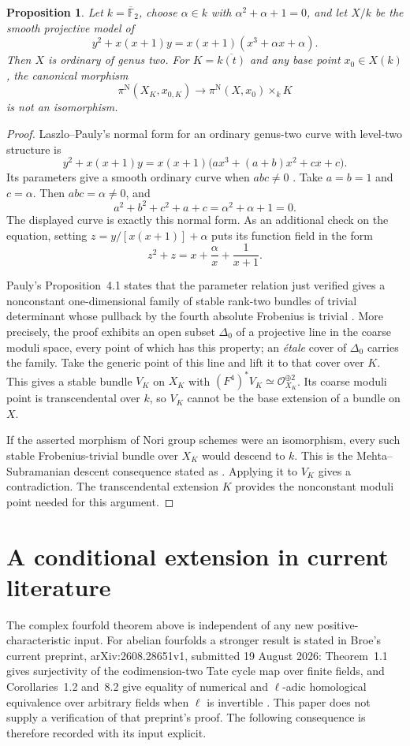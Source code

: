 \documentclass[11pt,a4paper]{article}
\newtheorem{proposition}[theorem]{Proposition}
\theoremstyle{definition}
\newcommand{\F}{\mathbb F}
\begin{document}
\begin{proposition}\label{prop:explicit-nori}
Let $k=\overline{\F}_2$, choose $\alpha\in k$ with $\alpha^2+\alpha+1=0$, and let $X/k$ be the smooth projective model of
\[
 y^2+x(x+1)y=x(x+1)(x^3+\alpha x+\alpha).
\]
Then $X$ is ordinary of genus two. For $K=\overline{k(t)}$ and any base point $x_0\in X(k)$, the canonical morphism
\[
 \pi^{\mathrm N}(X_K,x_{0,K})\longrightarrow
 \pi^{\mathrm N}(X,x_0)\times_k K
\]
is not an isomorphism.
\end{proposition}
\begin{proof}
Laszlo--Pauly's normal form for an ordinary genus-two curve with level-two structure is
\[
 y^2+x(x+1)y=x(x+1)\bigl(ax^3+(a+b)x^2+cx+c\bigr).
\]
Its parameters give a smooth ordinary curve when $abc\ne0$ \cite[\S2.3, Lemma~2.1, author version p.~3]{LaszloPauly}. Take $a=b=1$ and $c=\alpha$. Then $abc=\alpha\ne0$, and
\[
 a^2+b^2+c^2+a+c=\alpha^2+\alpha+1=0.
\]
The displayed curve is exactly this normal form. As an additional check on the equation, setting $z=y/[x(x+1)]+\alpha$ puts its function field in the form
\[
 z^2+z=x+\frac{\alpha}{x}+\frac1{x+1}.
\]

Pauly's Proposition~4.1 states that the parameter relation just verified gives a nonconstant one-dimensional family of stable rank-two bundles of trivial determinant whose pullback by the fourth absolute Frobenius is trivial \cite[Proposition~4.1, author version pp.~2--4]{PaulyNori}. More precisely, the proof exhibits an open subset $\Delta_0$ of a projective line in the coarse moduli space, every point of which has this property; an \emph{\'etale} cover of $\Delta_0$ carries the family. Take the generic point of this line and lift it to that cover over $K$. This gives a stable bundle $V_K$ on $X_K$ with $(F^4)^*V_K\simeq\mathcal O_{X_K}^{\oplus2}$. Its coarse moduli point is transcendental over $k$, so $V_K$ cannot be the base extension of a bundle on $X$.

If the asserted morphism of Nori group schemes were an isomorphism, every such stable Frobenius-trivial bundle over $X_K$ would descend to $k$. This is the Mehta--Subramanian descent consequence stated as \cite[Proposition~2.2, author version p.~2]{PaulyNori}. Applying it to $V_K$ gives a contradiction. The transcendental extension $K$ provides the nonconstant moduli point needed for this argument.
\end{proof}


\section{A conditional extension in current literature}
The complex fourfold theorem above is independent of any new positive-characteristic input. For abelian fourfolds a stronger result is stated in Broe's current preprint, arXiv:2608.28651v1, submitted 19 August 2026: Theorem~1.1 gives surjectivity of the codimension-two Tate cycle map over finite fields, and Corollaries~1.2 and~8.2 give equality of numerical and $\ell$-adic homological equivalence over arbitrary fields when $\ell$ is invertible \cite{Broe}. This paper does not supply a verification of that preprint's proof. The following consequence is therefore recorded with its input explicit.
\end{document}
